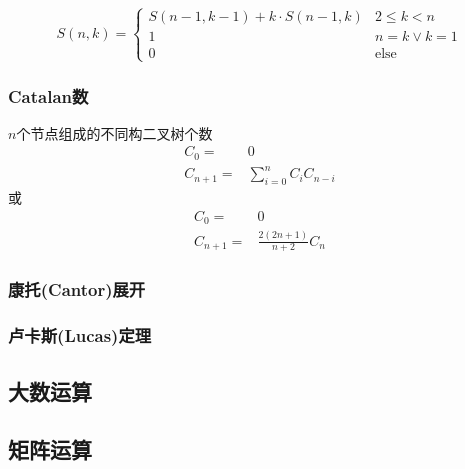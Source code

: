 \begin{displaymath}
S(n, k) = 
\begin{cases}
S(n-1, k-1) + k\cdot S(n-1, k) & 2\leqslant k < n\\
1 & n=k \vee k=1 \\
0 & \text{else}
\end{cases}
\end{displaymath}
$$ $$

\subsubsection{Catalan数}
$n$个节点组成的不同构二叉树个数
\begin{align*}
C_0     = & 0 \\
C_{n+1} = & \sum_{i=0}^n C_i C_{n-i}
\end{align*}
或
\begin{align*}
C_0     = & 0 \\
C_{n+1} = & \frac{2(2n+1)}{n+2} C_n
\end{align*}

\subsubsection{康托(Cantor)展开}

\subsubsection{卢卡斯(Lucas)定理}

\subsection{大数运算}

\subsection{矩阵运算}
